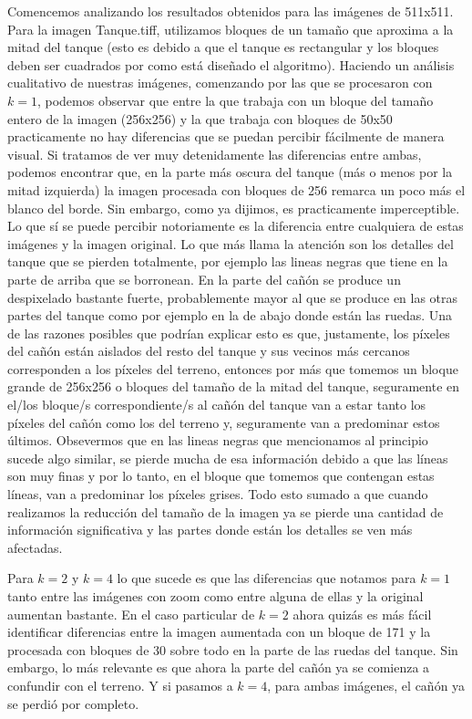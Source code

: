 \documentclass[a4paper]{article}
\begin{document}
Comencemos analizando los resultados obtenidos para las imágenes de 511x511. Para la imagen Tanque.tiff, utilizamos bloques de un tamaño que aproxima a la mitad del tanque (esto es debido a que el tanque es rectangular y los bloques deben ser cuadrados por como está diseñado el algoritmo). Haciendo un análisis cualitativo de nuestras imágenes, comenzando por las que se procesaron con $k = 1$, podemos observar que entre la que trabaja con un bloque del tamaño entero de la imagen (256x256) y la que trabaja con bloques de 50x50 practicamente no hay diferencias que se puedan percibir fácilmente de manera visual. Si tratamos de ver muy detenidamente las diferencias entre ambas, podemos encontrar que, en la parte más oscura del tanque (más o menos por la mitad izquierda) la imagen procesada con bloques de 256 remarca un poco más el blanco del borde. Sin embargo, como ya dijimos, es practicamente imperceptible. Lo que sí se puede percibir notoriamente es la diferencia entre cualquiera de estas imágenes y la imagen original. Lo que más llama la atención son los detalles del tanque que se pierden totalmente, por ejemplo las lineas negras que tiene en la parte de arriba que se borronean. En la parte del cañón se produce un despixelado bastante fuerte, probablemente mayor al que se produce en las otras partes del tanque como por ejemplo en la de abajo donde están las ruedas. Una de las razones posibles que podrían explicar esto es que, justamente, los píxeles del cañón están aislados del resto del tanque y sus vecinos más cercanos corresponden a los píxeles del terreno, entonces por más que tomemos un bloque grande de 256x256 o bloques del tamaño de la mitad del tanque, seguramente en el/los bloque/s correspondiente/s al cañón del tanque van a estar tanto los píxeles del cañón como los del terreno y, seguramente van a predominar estos últimos. Obsevermos que en las lineas negras que mencionamos al principio sucede algo similar, se pierde mucha de esa información debido a que las líneas son muy finas y por lo tanto, en el bloque que tomemos que contengan estas líneas, van a predominar los píxeles grises. Todo esto sumado a que cuando realizamos la reducción del tamaño de la imagen ya se pierde una cantidad de información significativa y las partes donde están los detalles se ven más afectadas.
\par Para $k = 2$ y $k = 4$ lo que sucede es que las diferencias que notamos para $k = 1$ tanto entre las imágenes con zoom como entre alguna de ellas y la original aumentan bastante. En el caso particular de $k = 2$ ahora quizás es más fácil identificar diferencias entre la imagen aumentada con un bloque de 171 y la procesada con bloques de 30 sobre todo en la parte de las ruedas del tanque. Sin embargo, lo más relevante es que ahora la parte del cañón ya se comienza a confundir con el terreno. Y si pasamos a $k = 4$, para ambas imágenes, el cañón ya se perdió por completo.
\end{document}
